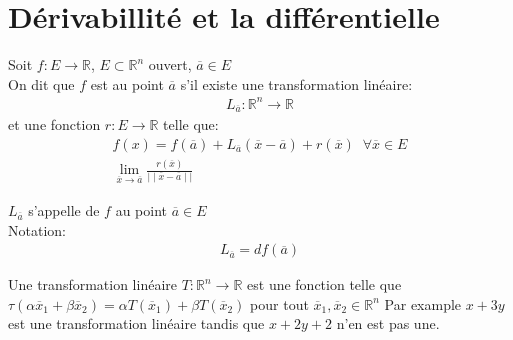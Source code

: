        
           \section{Dérivabillité et la différentielle}
           \begin{definition}
               Soit $f: E \to \mathbb{R}$, $E \subset \mathbb{R}^n $ ouvert, $ \overline{a} \in E$\\
               On dit que $f$ est  au point $ \overline{a}$ s'il existe une transformation linéaire:
               \begin{align*}
                   L_{ \overline{a}}: \mathbb{R}^n  \to \mathbb{R}
               \end{align*}
               et une fonction $ r: E \to \mathbb{R}$ telle que:
               \begin{align*}
                   f(x) = f( \overline{a}) + L_{ \overline{a}}( \overline{x} - \overline{a}) + r ( \overline{x}) \; \; \forall \overline{x} \in E\\
                   \lim_{ \overline{x} \to \overline{a}} \frac{r( \overline{x})}{ \mid \mid \overline{x} - \overline{a} \mid \mid}
               \end{align*}
           \end{definition}
           \begin{definition}
               $L_{ \overline{a}}$ s'appelle  de $f$ au point $ \overline{a} \in E$\\
Notation:
\begin{align*}
    L_{ \overline{a}} = df( \overline{a})
\end{align*}

           \end{definition}
           \begin{framedremark}
               Une transformation linéaire $ T: \mathbb{R}^n  \to \mathbb{R}$ est une fonction telle que $\tau ( \alpha \overline{x}_1 + \beta \overline{x}_2) = \alpha T( \overline{x}_1) + \beta T( \overline{x}_2)$ pour tout $ \overline{x}_1, \overline{x}_2 \in \mathbb{R}^n $
Par example $x + 3y$ est une transformation linéaire tandis que $ x + 2y + 2$ n'en est pas une.
               
           \end{framedremark}
           
           
